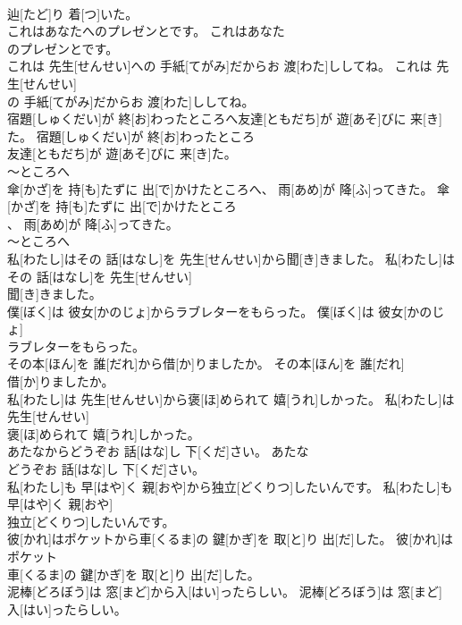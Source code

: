 \documentclass[8pt]{extreport}
\begin{document}
\begin{CJK}{UTF8}{min}
\\	辿[たど]り 着[つ]いた。	
\\	これはあなたへのプレゼンとです。	これはあなた
\\	のプレゼンとです。	
\\	これは 先生[せんせい]への 手紙[てがみ]だからお 渡[わた]ししてね。	これは 先生[せんせい]
\\	の 手紙[てがみ]だからお 渡[わた]ししてね。	
\\	宿題[しゅくだい]が 終[お]わったところへ友達[ともだち]が 遊[あそ]びに 来[き]た。	宿題[しゅくだい]が 終[お]わったところ
\\	友達[ともだち]が 遊[あそ]びに 来[き]た。	
\\	～ところへ 
\\	傘[かざ]を 持[も]たずに 出[で]かけたところへ、 雨[あめ]が 降[ふ]ってきた。	傘[かざ]を 持[も]たずに 出[で]かけたところ
\\	、 雨[あめ]が 降[ふ]ってきた。	
\\	～ところへ 
\\	私[わたし]はその 話[はなし]を 先生[せんせい]から聞[き]きました。	私[わたし]はその 話[はなし]を 先生[せんせい]
\\	聞[き]きました。	
\\	僕[ぼく]は 彼女[かのじょ]からラブレターをもらった。	僕[ぼく]は 彼女[かのじょ]
\\	ラブレターをもらった。	
\\	その本[ほん]を 誰[だれ]から借[か]りましたか。	その本[ほん]を 誰[だれ]
\\	借[か]りましたか。	
\\	私[わたし]は 先生[せんせい]から褒[ほ]められて 嬉[うれ]しかった。	私[わたし]は 先生[せんせい]
\\	褒[ほ]められて 嬉[うれ]しかった。	
\\	あたなからどうぞお 話[はな]し 下[くだ]さい。	あたな
\\	どうぞお 話[はな]し 下[くだ]さい。	
\\	私[わたし]も 早[はや]く 親[おや]から独立[どくりつ]したいんです。	私[わたし]も 早[はや]く 親[おや]
\\	独立[どくりつ]したいんです。	
\\	彼[かれ]はポケットから車[くるま]の 鍵[かぎ]を 取[と]り 出[だ]した。	彼[かれ]はポケット
\\	車[くるま]の 鍵[かぎ]を 取[と]り 出[だ]した。	
\\	泥棒[どろぼう]は 窓[まど]から入[はい]ったらしい。	泥棒[どろぼう]は 窓[まど]
\\	入[はい]ったらしい。	

\end{CJK}
\end{document}
